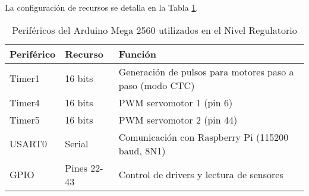 La configuración de recursos se detalla en la Tabla \ref{tab:perifericos_regulatorio}.

\begin{table}[H]
\centering
\begin{tabular}{|l|l|p{6cm}|}
\hline
\textbf{Periférico} & \textbf{Recurso} & \textbf{Función} \\
\hline
Timer1 & 16 bits & Generación de pulsos para motores paso a paso (modo CTC) \\
\hline
Timer4 & 16 bits & PWM servomotor 1 (pin 6) \\
\hline
Timer5 & 16 bits & PWM servomotor 2 (pin 44) \\
\hline
USART0 & Serial & Comunicación con Raspberry Pi (115200 baud, 8N1) \\
\hline
GPIO & Pines 22-43 & Control de drivers y lectura de sensores \\
\hline
\end{tabular}
\caption{Periféricos del Arduino Mega 2560 utilizados en el Nivel Regulatorio}
\label{tab:perifericos_regulatorio}
\end{table}